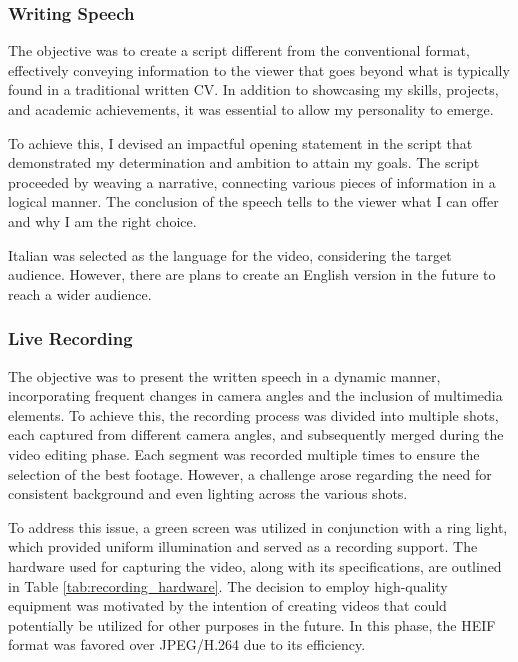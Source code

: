 \documentclass{article}
\begin{document}
\begin{multicols}{2}
    
        \subsubsection{Writing Speech}
        The objective was to create a script different from the conventional format, effectively conveying information to the viewer that goes beyond what is typically 
        found in a traditional written CV. In addition to showcasing my skills, projects, and academic achievements, it was essential to allow my personality to emerge.

        To achieve this, I devised an impactful opening statement in the script that demonstrated my determination and ambition to attain my goals. The script proceeded by weaving 
        a narrative, connecting various pieces of information in a logical manner. The conclusion of the speech tells to the viewer what I can offer and why I am the right 
        choice.

        Italian was selected as the language for the video, considering the target audience. However, there are plans to create an English version in the future to reach a wider 
        audience.

        \subsubsection{Live Recording}
        The objective was to present the written speech in a dynamic manner, incorporating frequent changes in camera angles and the inclusion of multimedia elements. To achieve this, 
        the recording process was divided into multiple shots, each captured from different camera angles, and subsequently merged during the video editing phase. Each segment was 
        recorded multiple times to ensure the selection of the best footage. However, a challenge arose regarding the need for consistent background and even lighting across the various shots.

        To address this issue, a green screen was utilized in conjunction with a ring light, which provided uniform illumination and served as a recording support. The hardware used for 
        capturing the video, along with its specifications, are outlined in Table \ref{tab:recording_hardware}. The decision to employ high-quality equipment was motivated by the intention 
        of creating videos that could potentially be utilized for other purposes in the future. In this phase, the HEIF format was favored over JPEG/H.264 due to its efficiency.


\end{multicols}
\end{document}
